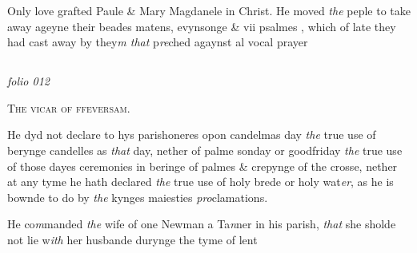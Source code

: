 \documentclass[12pt, a4paper]{book}
\begin{document}
 
				\marginpar[\vspace{0.5cm}{\textcolor{Gray}{n}}]{}
			
		\ifthenelse{\isodd{\thepage}}
		{\reversemarginpar}
		{\normalmarginpar}
		Only love grafted Paule \& Mary Magdanele in Christ.
 He moved \textit{the} peple to take away ageyne their beades matens, evynsonge \& vii psalmes
			, which
 of late they had cast away by they\textit{m that} p\textit{re}ched agaynst al vocal
 prayer


            
            
\dotfill
						\newpage {} \subsection*{}

\textit{folio 012}


            
            	
				\begin{center} \begin{large} {\scshape The vicar of ffeversam.} \end{large} \end{center}
			


				\marginpar[\vspace{0.5cm}{\textcolor{Gray}{ceremonies n}}]{}
			 
				\marginpar[\vspace{0.5cm}{\textcolor{Gray}{1}}]{}
			
		\ifthenelse{\isodd{\thepage}}
		{\reversemarginpar}
		{\normalmarginpar}
		He dyd not declare to hys parishoneres opon candelmas day
 \textit{the} true use of berynge candelles as \textit{that} day, nether of palme
 sonday or goodfriday \textit{the} true use of those dayes ceremonies
 in beringe of palmes \& crepynge of the crosse, nether at
 any tyme he hath declared \textit{the} true use of holy brede or
 holy wat\textit{er}, as he is bownde to do by \textit{the} kynges maiesties
 \textit{pro}clamations.

				\marginpar[\vspace{0.5cm}{\textcolor{Gray}{lent}}]{}
			
				\marginpar[\vspace{0.5cm}{\textcolor{Gray}{2}}]{}
			
		\ifthenelse{\isodd{\thepage}}
		{\reversemarginpar}
		{\normalmarginpar}
		He co\textit{m}manded \textit{the} wife of one Newman a Ta\textit{n}ner in
 his parish, \textit{that} she sholde not lie w\textit{ith} her husbande durynge the tyme of lent
\end{document}

